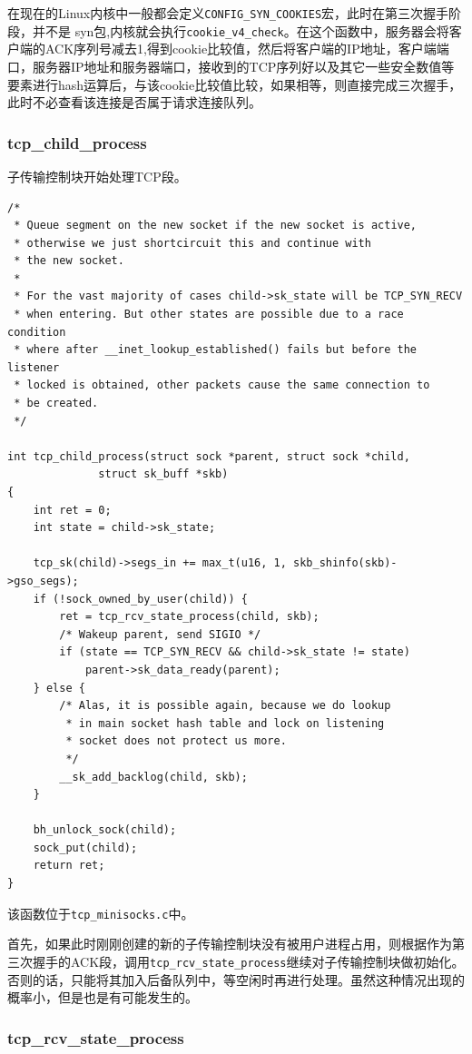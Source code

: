 					在现在的Linux内核中一般都会定义\texttt{CONFIG_SYN_COOKIES}宏，此时在第三次握手阶段，并不是 syn包,内核就会执行\texttt{cookie_v4_check}。在这个函数中，服务器会将客户端的ACK序列号减去1,得到cookie比较值，然后将客户端的IP地址，客户端端口，服务器IP地址和服务器端口，接收到的TCP序列好以及其它一些安全数值等要素进行hash运算后，与该cookie比较值比较，如果相等，则直接完成三次握手，此时不必查看该连接是否属于请求连接队列。

				\subsubsection{tcp\_child\_process}

					子传输控制块开始处理TCP段。
\begin{verbatim}
/*
 * Queue segment on the new socket if the new socket is active,
 * otherwise we just shortcircuit this and continue with
 * the new socket.
 *
 * For the vast majority of cases child->sk_state will be TCP_SYN_RECV
 * when entering. But other states are possible due to a race condition
 * where after __inet_lookup_established() fails but before the listener
 * locked is obtained, other packets cause the same connection to
 * be created.
 */

int tcp_child_process(struct sock *parent, struct sock *child,
		      struct sk_buff *skb)
{
	int ret = 0;
	int state = child->sk_state;

	tcp_sk(child)->segs_in += max_t(u16, 1, skb_shinfo(skb)->gso_segs);
	if (!sock_owned_by_user(child)) {
		ret = tcp_rcv_state_process(child, skb);
		/* Wakeup parent, send SIGIO */
		if (state == TCP_SYN_RECV && child->sk_state != state)
			parent->sk_data_ready(parent);
	} else {
		/* Alas, it is possible again, because we do lookup
		 * in main socket hash table and lock on listening
		 * socket does not protect us more.
		 */
		__sk_add_backlog(child, skb);
	}

	bh_unlock_sock(child);
	sock_put(child);
	return ret;
}
\end{verbatim}

				该函数位于\texttt{tcp_minisocks.c}中。

				首先，如果此时刚刚创建的新的子传输控制块没有被用户进程占用，则根据作为第三次握手的ACK段，调用\texttt{tcp_rcv_state_process}继续对子传输控制块做初始化。否则的话，只能将其加入后备队列中，等空闲时再进行处理。虽然这种情况出现的概率小，但是也是有可能发生的。

				\subsubsection{tcp\_rcv\_state\_process}


